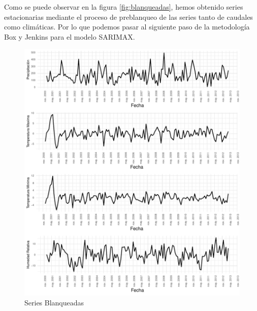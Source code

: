\documentclass[12pt,oneside]{book}\usepackage[]{graphicx}\usepackage[]{color}
\makeatletter
\def\maxwidth{ %
  \ifdim\Gin@nat@width>\linewidth
    \linewidth
  \else
    \Gin@nat@width
  \fi
}
\newenvironment{knitrout}{}{} %
\theoremstyle{definition} %
\makeatother
\begin{document}
Como se puede observar en la figura \ref{fig:blanqueadas}, hemos obtenido series estacionarias mediante el proceso de preblanqueo de las series tanto de caudales como climáticas. Por lo que podemos pasar al siguiente paso de la metodología Box y Jenkins para el modelo SARIMAX.




\begin{knitrout}
\color{fgcolor}\begin{figure}[H]

{\centering \includegraphics[width=\maxwidth]{figure/unnamed-chunk-31-1} 

}

\caption{\label{fig:blanqueadas} Series Blanqueadas}\label{fig:unnamed-chunk-31}
\end{figure}


\end{knitrout}
\end{document}
